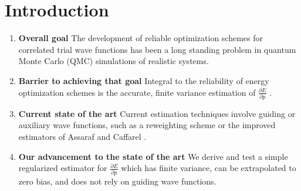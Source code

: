 \documentclass{article}
\begin{document}
\section{Introduction}
\begin{enumerate}
\item \textbf{Overall goal } The development of reliable optimization schemes for correlated trial wave functions has been a long standing problem in quantum Monte Carlo (QMC) simulations of realistic systems.

\item \textbf{Barrier to achieving that goal } Integral to the reliability of energy optimization schemes is the accurate, finite variance estimation of $\frac{\partial E}{\partial p}$ \cite{PhysRevB.64.024512, doi:10.1063/1.1604379, Toulouse2007}.

\item \textbf{Current state of the art} Current estimation techniques involve guiding or auxiliary wave functions, such as a reweighting scheme \cite{Attaccalite2008, Avella} or the improved estimators of Assaraf and Caffarel \cite{doi:10.1063/1.1286598, Assaraf2003}.

\item \textbf{Our advancement to the state of the art } We derive and test a simple regularized estimator for $\frac{\partial E}{\partial p}$ which has finite variance, can be extrapolated to zero bias, and does not rely on guiding wave functions.
\end{enumerate}
\end{document}
